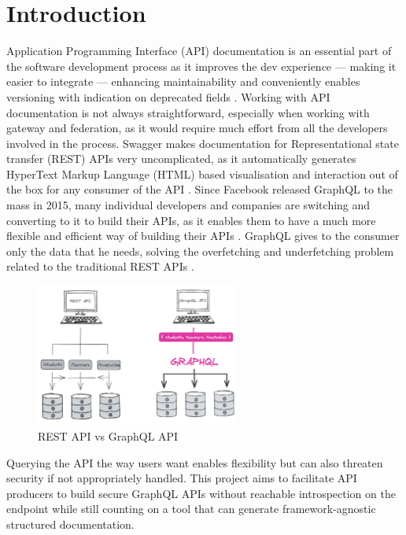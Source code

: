 \section*{Introduction}
\label{s:Introduction}
Application Programming Interface (API) documentation is an essential part of
the software development process as it improves the dev experience --- making it
easier to integrate --- enhancing maintainability and conveniently enables
versioning with indication on deprecated fields
\citep{fanWhyAPIDocumentation2021}. Working with API documentation is not always
straightforward, especially when working with gateway and federation, as it
would require much effort from all the developers involved in the process.
Swagger makes documentation for Representational state transfer (REST) APIs very
uncomplicated, as it automatically generates HyperText Markup Language (HTML)
based visualisation and interaction out of the box for any consumer of the API
\citep{korenExploitationOpenAPIDocumentation2018}. Since Facebook released
GraphQL to the mass in 2015, many individual developers and companies are
switching and converting to it to build their APIs, as it enables them to have a
much more flexible and efficient way of building their APIs
\citep{britoRESTVsGraphQL2020}. GraphQL gives to the consumer only the data that
he needs, solving the overfetching and underfetching problem related to the
traditional REST APIs \citep{witternGeneratingGraphQLWrappersREST2018}.
\begin{figure}[H]
  \centering
  \includegraphics[width=0.6\textwidth]{figures/restvsgraph}
  \caption{REST API vs GraphQL API}
  \label{f:restvsgraph}
\end{figure}
Querying the API the way users want enables flexibility but can also threaten
security if not appropriately handled. This project aims to facilitate API
producers to build secure GraphQL APIs without reachable introspection on the
endpoint while still counting on a tool that can generate framework-agnostic
structured documentation.

